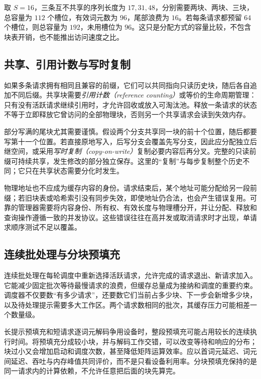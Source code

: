 \documentclass[UTF8,12pt,a4paper,fontset=fandol]{ctexart}
\begin{document}
\begin{example}[块大小与尾部浪费]
取 $S=16$，三条互不共享的序列长度为 $17,31,48$，分别需要两块、两块、三块，总容量为 $112$ 个槽位，有效词元数为 $96$，尾部浪费为 $16$。若每条请求都预留 $64$ 个槽位，则总容量为 $192$，未用槽位为 $96$。这只是分配方式的容量比较，不包含块表开销，也不能推出访问速度之比。
\end{example}

\subsection{共享、引用计数与写时复制}

如果多条请求拥有相同且兼容的前缀，它们可以共同指向只读历史块，随后各自追加不同后缀。共享块需要\emph{引用计数（reference counting）}或等价的生命周期管理：只有没有活跃请求继续引用时，才允许回收或放入可淘汰池。释放一条请求的状态不等于立即释放它曾访问的全部物理块，否则另一个共享请求会读到失效内存。

部分写满的尾块尤其需要谨慎。假设两个分支共享同一块的前十个位置，随后都要写第十一个位置。若直接原地写入，后写分支会覆盖先写分支，因此应分配独立后继空间，或采用\emph{写时复制（copy-on-write）}复制必要内容后再分叉。完整的只读前缀可持续共享，发生修改的部分独立保存。这里的“复制”与每步复制整个历史不同；它只在共享状态需要分化时发生。

物理地址也不应成为缓存内容的身份。请求结束后，某个地址可能分配给另一段前缀；若旧块表或哈希索引没有同步失效，即使地址仍合法，也会产生错误复用。可靠的管理器需要将内容身份、所有权、有效长度与物理槽分开，并让分配、释放和查询操作遵循一致的并发协议。这些错误往往在高并发或取消请求时才出现，单请求顺序测试不足以覆盖。

\subsection{连续批处理与分块预填充}

连续批处理在每轮调度中重新选择活跃请求，允许完成的请求退出、新请求加入。它能减少固定批次等待最慢请求的浪费，但缓存总量成为接纳和调度的重要约束。调度器不仅要数“有多少请求”，还要数它们当前占多少块、下一步会新增多少块，以及待处理提示需要多大工作区。两个请求数相同的批次，其缓存压力可能相差一个数量级。

长提示预填充和短请求逐词元解码争用设备时，整段预填充可能占用较长的连续执行时间。将预填充分成较小块，并与解码工作交错，可以改变等待和响应的分布；块过小又会增加启动和调度次数，甚至降低矩阵运算效率。应以首词元延迟、词元间延迟、吞吐与内存峰值共同评价，而不是只看设备利用率。分块预填充保持的是同一请求内的计算依赖，不允许任意把后面的块先算完。
\end{document}
